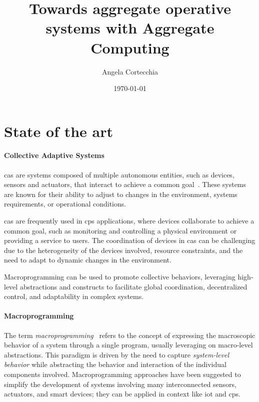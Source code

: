 \documentclass[12pt, a4paper]{article}
\begin{document}
\title{Towards aggregate operative systems with Aggregate Computing}
\author{Angela Cortecchia}
\date{\today}
\maketitle
%

\section{State of the art}\label{sec:state-of-the-art}
\paragraph{Collective Adaptive Systems}

\ac{cas} are systems composed of multiple autonomous entities, such as devices, sensors and actuators,
that interact to achieve a common goal~\cite{ferscha2015}.
%
These systems are known for their ability to adjust to changes in the environment,
systems requirements, or operational conditions.

\ac{cas} are frequently used in \ac{cps} applications,
where devices collaborate to achieve a common goal,
such as monitoring and controlling a physical environment or providing a service to users.
%
The coordination of devices in \ac{cas} can be challenging due to the heterogeneity of the devices involved,
resource constraints, and the need to adapt to dynamic changes in the environment.

Macroprogramming can be used to promote collective behaviors,
leveraging high-level abstractions and constructs to facilitate global coordination,
decentralized control, and adaptability in complex systems.


\paragraph{Macroprogramming}
The term \emph{macroprogramming}~\cite{casadei2023} refers to the concept of expressing the macroscopic behavior of a system
through a single program,
usually leveraging on macro-level abstractions.
%
This paradigm is driven by the need to capture \emph{system-level behavior} while abstracting the behavior and interaction
of the individual components involved.
%
Macroprogramming approaches have been suggested to simplify the development of systems involving many interconnected sensors,
actuators, and smart devices;
they can be applied in context like \ac{iot} and \ac{cps}.
\end{document}

